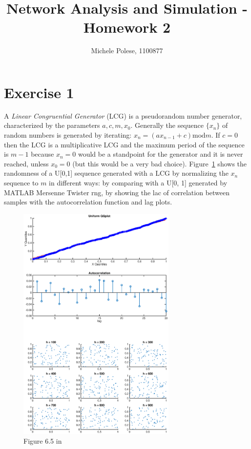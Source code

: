 \documentclass[10pt]{article}
\begin{document}
\title{Network Analysis and Simulation - Homework 2}
\author{Michele Polese, 1100877}

\maketitle

\section{Exercise 1}
A \textit{Linear Congruential Generator} (LCG) is a pseudorandom number generator, characterized by the parameters $a, c, m, x_0$. Generally the sequence $\{x_n\}$ of random numbers is generated by iterating: $x_n = (ax_{n-1} + c) \text{mod} m$. If $c = 0$ then the LCG is a multiplicative LCG and the maximum period of the sequence is $m-1$ because $x_n = 0$ would be a standpoint for the generator and it is never reached, unless $x_0 = 0$ (but this would be a very bad choice).
Figure~\ref{fig:65} shows the randomness of a U[0,1] sequence generated with a LCG by normalizing the $x_n$ sequence to $m$ in different ways: by comparing with a U[0, 1] generated by MATLAB Mersenne Twister rng, by showing the lac of correlation between samples with the autocorrelation function and lag plots.
\begin{figure}
  \centering
  \includegraphics[width=0.7\textwidth]{images/hw2_1_65}
  \caption{Figure 6.5 in \cite{leb}}
  \label{fig:65}
\end{figure}
\end{document}
